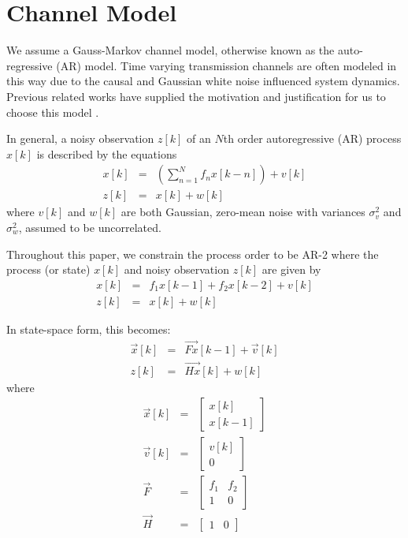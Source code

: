 \documentclass[twocolumn,letterpaper]{IEEEAerospaceCLS}  %
\begin{document}
\section{Channel Model}
\label{sec:channelmodel}

We assume a Gauss-Markov channel model, otherwise known as the auto-regressive (AR) model. Time varying transmission channels are often modeled in this way due to the causal and Gaussian white noise influenced system dynamics. Previous related works have supplied the motivation and justification for us to choose this model \cite{181202986} \cite{baddour2001autoregressive}.

In general, a noisy observation $z[k]$ of an $N$th order autoregressive (AR) process $x[k]$ is described by the equations
\begin{eqnarray*}
x[k]&=&\left(\sum_{n=1}^N f_{n}x[k-n]\right) + v[k]\\
z[k]&=&x[k] + w[k]
\end{eqnarray*}
where $v[k]$ and $w[k]$ are both Gaussian, zero-mean noise with variances $\sigma_v^2$ and $\sigma_w^2$, assumed to be uncorrelated.

Throughout this paper, we constrain the process order to be AR-2 where the process (or state) $x[k]$ and noisy observation $z[k]$ are given by
\begin{eqnarray*}
x[k]&=&f_1x[k-1]+ f_2x[k-2] + v[k]\\
z[k]&=&x[k] + w[k]
\end{eqnarray*}

In state-space form, this becomes:
\begin{eqnarray*}
\vec{x}[k]&=&\vec{Fx}[k-1]+\vec{v}[k]\\
z[k]&=&\vec{Hx}[k]+w[k]
\end{eqnarray*}
where
\begin{eqnarray*}
\vec{x}[k]&=&\begin{bmatrix}
    x[k]\\ x[k-1]
\end{bmatrix}\\
\vec{v}[k]&=&\begin{bmatrix}
    v[k]\\ 0
\end{bmatrix}\\
\vec{F}&=&\begin{bmatrix}
    f_1       & f_2 \\
    1       & 0 
\end{bmatrix}\\
\vec{H}&=&\begin{bmatrix}
    1       & 0 
\end{bmatrix}
\end{eqnarray*}
\end{document}
